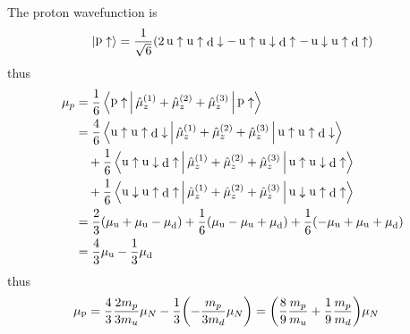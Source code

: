 \documentclass[10pt,aspectratio=43,mathserif]{beamer}
\DeclareMathOperator{\rp}{\mathrm{p}}
\DeclareMathOperator{\ru}{\mathrm{u}}
\DeclareMathOperator{\rd}{\mathrm{d}}
\numberwithin{equation}{section}
\begin{document}
\begin{frame}
The proton wavefunction is
\begin{equation}\label{key}
\ket{\rp\uparrow} = \dfrac{1}{\sqrt{6}}(2\ru\uparrow\ru\uparrow\rd\downarrow - \ru\uparrow\ru\downarrow\rd\uparrow - \ru\downarrow\ru\uparrow\rd\uparrow)
\end{equation}
thus
\begin{align}
\mu_p &= \dfrac{1}{6}\Braket{\rp\uparrow | \hat\mu_z^{(1)} + \hat\mu_z^{(2)} + \hat\mu_z^{(3)} | \rp\uparrow} \notag\\
&= \dfrac{4}{6}\Braket{\ru\uparrow\ru\uparrow\rd\downarrow | \hat\mu_z^{(1)} + \hat\mu_z^{(2)} + \hat\mu_z^{(3)} | \ru\uparrow\ru\uparrow\rd\downarrow} \notag\\
&\quad {} + \dfrac{1}{6}\Braket{\ru\uparrow\ru\downarrow\rd\uparrow | \hat\mu_z^{(1)} + \hat\mu_z^{(2)} + \hat\mu_z^{(3)} | \ru\uparrow\ru\downarrow\rd\uparrow} \notag\\
&\quad {} + \dfrac{1}{6}\Braket{\ru\downarrow\ru\uparrow\rd\uparrow | \hat\mu_z^{(1)} + \hat\mu_z^{(2)} + \hat\mu_z^{(3)} | \ru\downarrow\ru\uparrow\rd\uparrow} \notag\\
&= \dfrac{2}{3}(\mu_{\ru} + \mu_{\ru} - \mu_{\rd}) + \dfrac{1}{6}(\mu_{\ru} - \mu_{\ru} + \mu_{\rd}) + \dfrac{1}{6}(-\mu_{\ru} + \mu_{\ru} + \mu_{\rd}) \notag\\
&= \dfrac{4}{3}\mu_{\ru} - \dfrac{1}{3}\mu_{\rd}
\end{align}
thus
\begin{align}
\mu_{\rp} &= \dfrac{4}{3}\dfrac{2m_p}{3m_u}\mu_N - \dfrac{1}{3}\qty(-\dfrac{m_p}{3m_d}\mu_N) = \qty(\dfrac{8}{9}\dfrac{m_p}{m_u} + \dfrac{1}{9}\dfrac{m_p}{m_d})\mu_N
\end{align}

\end{frame}

\end{document}
